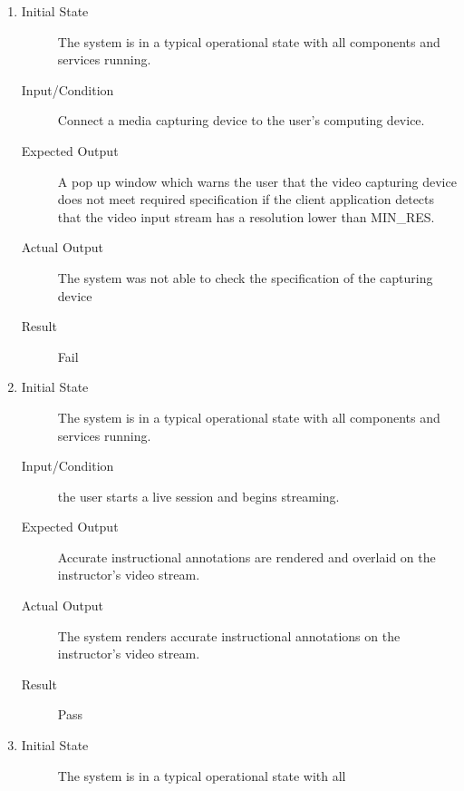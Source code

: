 \documentclass[12pt, titlepage]{article}
\begin{document}
\begin{enumerate}[NFR-T1]
  \item \label{NFRT11}
    \begin{description}
    \item[Initial State] The system is in a typical operational state with all
      components and services running.
    \item[Input/Condition] Connect a media capturing device to the user’s computing
      device.
    \item[Expected Output] A pop up window which warns the user that the video
      capturing device does not meet required specification if the client
      application detects that the video input stream has a resolution lower than
      MIN\_RES.
    \item[Actual Output] The system was not able to check the specification of the capturing 
    device
    \item[Result] Fail 
    \end{description}
  \item \label{NFRT12}
    \begin{description}
    \item[Initial State] The system is in a typical operational state with all
      components and services running.
    \item[Input/Condition] the user starts a live session and begins streaming.
    \item[Expected Output] Accurate instructional annotations are rendered and
      overlaid on the instructor’s video stream.
    \item[Actual Output] The system renders accurate instructional annotations on 
    the instructor’s video stream.
    \item[Result] Pass 
    \end{description}
  \item \label{NFRT13}
    \begin{description}
    \item[Initial State] The system is in a typical operational state with all

\end{description}
\end{enumerate}
\end{document}
